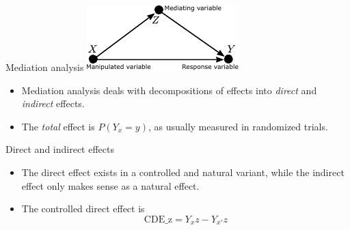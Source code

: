 


\begin{frame}{Mediation analysis}
    \centering
    \includegraphics[width=0.4\linewidth]{causal_figures/medanal1}%
    \begin{itemize}
        \item Mediation analysis deals with decompositions of effects into \emph{direct} and \emph{indirect} effects.
        \item The \emph{total} effect is $P(Y_x = y)$, as usually measured in randomized trials.
    \end{itemize}
\end{frame}


\begin{frame}{Direct and indirect effects}
    \begin{itemize}
        \item The direct effect exists in a controlled and natural variant, while the indirect effect only makes sense as a natural effect.
        \item The controlled direct effect is
        \begin{equation*}
            \textrm{CDE_z} = Y_xz - Y_{x'}z
        \end{equation*}
    \end{itemize}
\end{frame}

